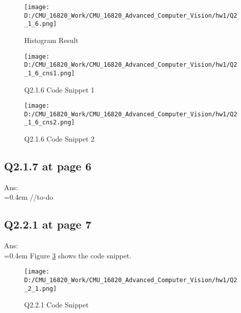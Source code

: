 \documentclass{article}
\begin{document}
	\begin{figure}[H]		
		\centering
		\texttt{[image: D:/CMU\_16820\_Work/CMU\_16820\_Advanced\_Computer\_Vision/hw1/Q2\_1\_6.png]}  %
		\caption{Histogram Result}
		\label{fig:hist_res}
	\end{figure}	
	
	\begin{figure}[H]
	\centering
	\begin{minipage}[b]{0.45\textwidth}
		\centering
		\texttt{[image: D:/CMU\_16820\_Work/CMU\_16820\_Advanced\_Computer\_Vision/hw1/Q2\_1\_6\_cns1.png]}  %
		\caption{Q2.1.6 Code Snippet 1}
		\label{fig:2_14_6_csn1}
	\end{minipage}
	\hfill  %
	\begin{minipage}[b]{0.45\textwidth}
		\centering
		\texttt{[image: D:/CMU\_16820\_Work/CMU\_16820\_Advanced\_Computer\_Vision/hw1/Q2\_1\_6\_cns2.png]}  %
		\caption{Q2.1.6 Code Snippet 2}
		\label{fig:2_14_6_csn2}
	\end{minipage}
	\end{figure}
	
	\newpage
	\subsection*{Q2.1.7 at page 6}
	Ans:\\
	\hangindent=0.4em \hspace{0.3em} //to-do
	
	\newpage
	\subsection*{Q2.2.1 at page 7}
	Ans:\\
	\hangindent=0.4em \hspace{0.3em} Figure \ref{fig:Q221_cns} shows the code snippet.
	\begin{figure}[H]		
		\centering
		\texttt{[image: D:/CMU\_16820\_Work/CMU\_16820\_Advanced\_Computer\_Vision/hw1/Q2\_2\_1.png]}  %
		\caption{Q2.2.1 Code Snippet}
		\label{fig:Q221_cns}
	\end{figure}
	
	\newpage
\end{document}

